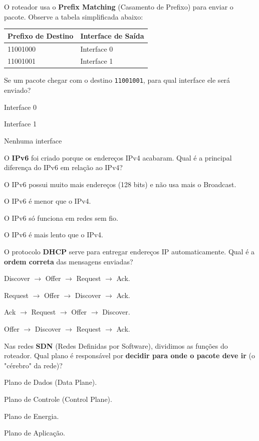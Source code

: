 \documentclass[12pt]{modelo/prova2}
\begin{document}
\question[1.0] O roteador usa o \textbf{Prefix Matching} (Casamento de Prefixo) para enviar o pacote. Observe a tabela simplificada abaixo:
\begin{center}
\begin{tabular}{ |p{4cm}|p{4cm}| } 
 \hline
 \textbf{Prefixo de Destino}& \textbf{Interface de Saída}\\ 
 \hline
 11001000 & Interface 0 \\
 11001001 & Interface 1 \\
 \hline
\end{tabular}
\end{center}
Se um pacote chegar com o destino \verb|11001001|, para qual interface ele será enviado?
\begin{choices}
\item Interface 0
\item Interface 1
\item Nenhuma interface
\end{choices}
\newpage
\question[1.0]  O \textbf{IPv6} foi criado porque os endereços IPv4 acabaram. Qual é a principal diferença do IPv6 em relação ao IPv4?
\begin{choices}
\item O IPv6 possui muito mais endereços (128 bits) e não usa mais o Broadcast.
\item O IPv6 é menor que o IPv4.
\item O IPv6 só funciona em redes sem fio.
\item O IPv6 é mais lento que o IPv4.
\end{choices}

\question[1.0] O protocolo \textbf{DHCP} serve para entregar endereços IP automaticamente. Qual é a \textbf{ordem correta} das mensagens enviadas?
\begin{choices}
    \item Discover $\to$ Offer $\to$ Request $\to$ Ack.
    \item Request $\to$ Offer $\to$ Discover $\to$ Ack.
    \item Ack $\to$ Request $\to$ Offer $\to$ Discover.
    \item Offer $\to$ Discover $\to$ Request $\to$ Ack.
\end{choices}

\question[1.0] Nas redes \textbf{SDN} (Redes Definidas por Software), dividimos as funções do roteador. Qual plano é responsável por \textbf{decidir para onde o pacote deve ir} (o "cérebro" da rede)?
\begin{choices}
\item Plano de Dados (Data Plane).
\item Plano de Controle (Control Plane).
\item Plano de Energia.
\item Plano de Aplicação.
\end{choices}
\end{document}
